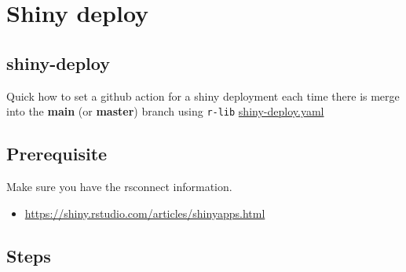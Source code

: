 \documentclass[
]{book}
\providecommand{\tightlist}{%
  \setlength{\itemsep}{0pt}\setlength{\parskip}{0pt}}
\begin{document}
\hypertarget{shiny-deploy}{%
\chapter{Shiny deploy}\label{shiny-deploy}}

\hypertarget{shiny-deploy-1}{%
\section{shiny-deploy}\label{shiny-deploy-1}}

Quick how to set a github action for a shiny deployment each time there is merge into the \textbf{main} (or \textbf{master}) branch using \texttt{r-lib} \href{https://github.com/r-lib/actions/blob/v2-branch/examples/shiny-deploy.yaml}{shiny-deploy.yaml}

\hypertarget{prerequisite-3}{%
\section{Prerequisite}\label{prerequisite-3}}

Make sure you have the rsconnect information.

\begin{itemize}
\tightlist
\item
  \url{https://shiny.rstudio.com/articles/shinyapps.html}
\end{itemize}

\hypertarget{steps-3}{%
\section{Steps}\label{steps-3}}
\end{document}
